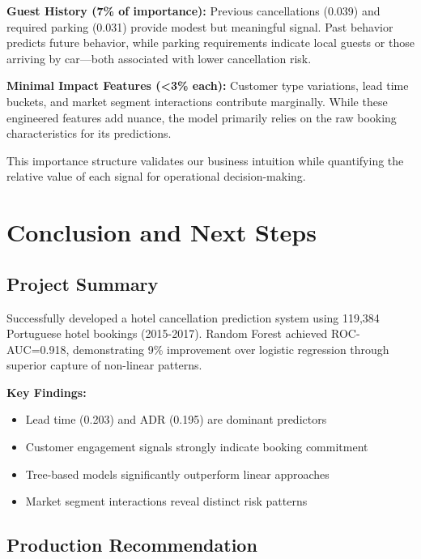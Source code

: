 \documentclass[
  letterpaper,
  DIV=11,
  numbers=noendperiod]{scrartcl}
\providecommand{\tightlist}{%
  \setlength{\itemsep}{0pt}\setlength{\parskip}{0pt}}
\begin{document}
\textbf{Guest History (7\% of importance):} Previous cancellations
(0.039) and required parking (0.031) provide modest but meaningful
signal. Past behavior predicts future behavior, while parking
requirements indicate local guests or those arriving by car---both
associated with lower cancellation risk.

\textbf{Minimal Impact Features (\textless3\% each):} Customer type
variations, lead time buckets, and market segment interactions
contribute marginally. While these engineered features add nuance, the
model primarily relies on the raw booking characteristics for its
predictions.

This importance structure validates our business intuition while
quantifying the relative value of each signal for operational
decision-making.

\section{Conclusion and Next Steps}\label{conclusion-and-next-steps}

\subsection{Project Summary}\label{project-summary}

Successfully developed a hotel cancellation prediction system using
119,384 Portuguese hotel bookings (2015-2017). Random Forest achieved
ROC-AUC=0.918, demonstrating 9\% improvement over logistic regression
through superior capture of non-linear patterns.

\textbf{Key Findings:}

\begin{itemize}
\tightlist
\item
  Lead time (0.203) and ADR (0.195) are dominant predictors
\item
  Customer engagement signals strongly indicate booking commitment
\item
  Tree-based models significantly outperform linear approaches
\item
  Market segment interactions reveal distinct risk patterns
\end{itemize}

\subsection{Production Recommendation}\label{production-recommendation}
\end{document}
